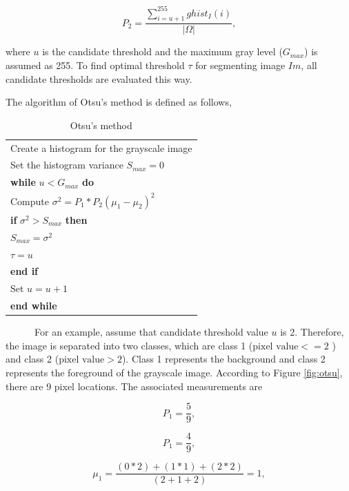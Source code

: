 \documentclass{article}
\begin{document}
\[P_2 = \frac{\sum_{i=u+1}^{255}ghist_I(i)}{|\Omega|},\]

where \(u\) is the candidate threshold and the maximum gray level
(\(G_{max}\)) is assumed as 255. To find optimal threshold \(\tau\) for
segmenting image \(Im\), all candidate thresholds are evaluated this
way.

The algorithm of Otsu's method is defined as follows,

\begin{table}[!ht]
\centering
\begin{tabular}{l}
\hline
Create a histogram for the grayscale image \\ 
Set the histogram variance $S_{max} = 0$                                             \\ \hline
\textbf{while} $u < G_{max}$ \textbf{do}                                             \\ \hline
Compute $\sigma^2 = P_1*P_2(\mu_1-\mu_2)^2$                                             \\ 
\textbf{if} $\sigma^2 > S_{max}$ \textbf{then}                                             \\ \hline
$S_{max} = \sigma^2$                                             \\
$\tau = u$                                             \\ \hline
\textbf{end if}                                             \\ 
Set $u = u+1$                                             \\ \hline
\textbf{end while}                                             \\ \hline
\end{tabular}
\caption{Otsu's method}
\label{tab:ot}
\end{table}

~~~~~~For an example, assume that candidate threshold value \(u\) is 2.
Therefore, the image is separated into two classes, which are class 1
(\(\text{pixel value} <= 2\) ) and class 2 (\(\text{pixel value} > 2\)).
Class 1 represents the background and class 2 represents the foreground
of the grayscale image. According to Figure \ref{fig:otsu}, there are 9
pixel locations. The associated measurements are

\[P_1 = \frac{5}{9},\]

\[P_1 = \frac{4}{9},\]

\[\mu_1 = \frac{(0*2) +(1*1) + (2*2)}{(2+1+2)} = 1,\]
\end{document}
